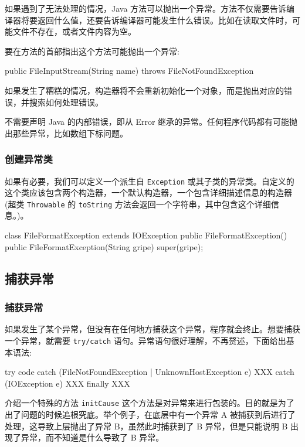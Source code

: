 如果遇到了无法处理的情况，Java 方法可以抛出一个异常。方法不仅需要告诉编译器将要返回什么值，还要告诉编译器可能发生什么错误。比如在读取文件时，可能文件不存在，或者文件内容为空。

要在方法的首部指出这个方法可能抛出一个异常:
\begin{Java}
public FileInputStream(String name) throws FileNotFoundException
\end{Java}

如果发生了糟糕的情况，构造器将不会重新初始化一个对象，而是抛出对应的错误，并搜索如何处理错误。

不需要声明 Java 的内部错误，即从 Error 继承的异常。任何程序代码都有可能抛出那些异常，比如数组下标问题。

\subsubsection{创建异常类}

如果有必要，我们可以定义一个派生自 \texttt{Exception} 或其子类的异常类。自定义的这个类应该包含两个构造器，一个默认构造器，一个包含详细描述信息的构造器(超类 \texttt{Throwable} 的 \texttt{toString} 方法会返回一个字符串，其中包含这个详细信息。)。

\begin{Java}
class FileFormatException extends IOException {
    public FileFormatException() {}
    public FileFormatException(String gripe) {
        super(gripe);
    }
}
\end{Java}

\subsection{捕获异常}
\subsubsection{捕获异常}

如果发生了某个异常，但没有在任何地方捕获这个异常，程序就会终止。想要捕获一个异常，就需要 \texttt{try/catch} 语句。异常语句很好理解，不再赘述，下面给出基本语法:

\begin{Java}
try {
    code
}
catch (FileNotFoundException | UnknownHostException e) {
    XXX
}
catch (IOException e) {
    XXX
}
finally {
    XXX
}
\end{Java}

介绍一个特殊的方法 \texttt{initCause} 这个方法是对异常来进行包装的。目的就是为了出了问题的时候追根究底。举个例子，在底层中有一个异常 A 被捕获到后进行了处理，这导致上层抛出了异常 B，虽然此时捕获到了 B 异常，但是只能说明 B 出现了异常，而不知道是什么导致了 B 异常。

